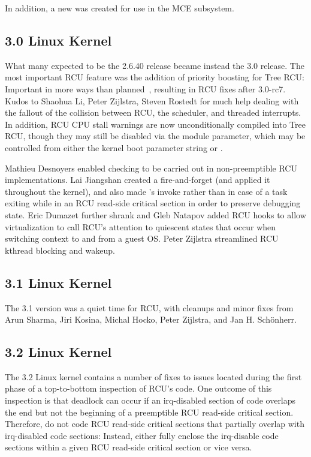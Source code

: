 In addition, a new  was created for use in the
MCE subsystem.

\subsection{3.0 Linux Kernel}

What many expected to be the 2.6.40 release became instead the 3.0 release.
The most important RCU feature was the addition of priority boosting
for Tree RCU: Important in more ways than
planned~\cite{PaulEMcKenney2011RCU3.0trainwreck}, resulting in RCU
fixes after 3.0-rc7.
Kudos to Shaohua Li, Peter Zijlstra, Steven Rostedt for much help
dealing with the fallout of the collision between RCU, the scheduler,
and threaded interrupts.
In addition, RCU CPU stall warnings are now unconditionally compiled
into Tree RCU, though they may still be disabled via the
 module parameter, which may be controlled
from either the kernel boot parameter string or .

Mathieu Desnoyers enabled  checking to
be carried out in non-preemptible RCU implementations.
Lai Jiangshan created a fire-and-forget  (and applied
it throughout the kernel),
and also made 's  invoke
rather than  in case of a task exiting while
in an RCU read-side critical section in order to preserve debugging
state.
Eric Dumazet further shrank  and
Gleb Natapov added RCU hooks to allow virtualization to call RCU's
attention to quiescent states that occur when switching context to
and from a guest OS.
Peter Zijlstra streamlined RCU kthread blocking and wakeup.

\subsection{3.1 Linux Kernel}

The 3.1 version was a quiet time for RCU, with cleanups and minor fixes
from Arun Sharma, Jiri Kosina, Michal Hocko, Peter Zijlstra,
and Jan H. Sch\"{o}nherr.

\subsection{3.2 Linux Kernel}

The 3.2 Linux kernel contains a number of fixes to issues located
during the first phase of a top-to-bottom inspection of RCU's code.
One outcome of this inspection is that deadlock can occur if
an irq-disabled section of code overlaps the end but not the beginning
of a preemptible RCU read-side critical section.
Therefore, do not code RCU read-side critical sections that partially
overlap with irq-disabled code sections:
Instead, either fully enclose the irq-disable code sections within a
given RCU read-side critical section or vice versa.

